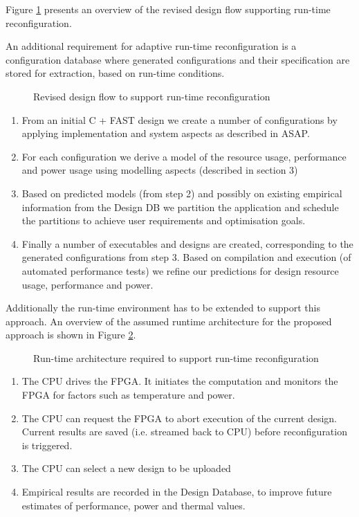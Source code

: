 Figure \ref{fig:reconfig-design-flow} presents an overview of the
revised design flow supporting run-time reconfiguration.

An additional requirement for adaptive run-time reconfiguration is a
configuration database where generated configurations and their
specification are stored for extraction, based on run-time
conditions.

\begin{figure}[!ht]
  \centering
  \def\svgwidth{\textwidth}
  
  \caption{Revised design flow to support run-time reconfiguration}
  \label{fig:reconfig-design-flow}
\end{figure}

\begin{enumerate}
\item From an initial C + FAST design we create a number of
  configurations by applying implementation and system aspects as
  described in ASAP.
\item For each configuration we derive a model of the resource usage,
  performance and power usage using modelling aspects (described in
  section 3)
\item Based on predicted models (from step 2) and possibly on existing
  empirical information from the Design DB we partition the
  application and schedule the partitions to achieve user requirements
  and optimisation goals.
\item Finally a number of executables and designs are created,
  corresponding to the generated configurations from step 3. Based on
  compilation and execution (of automated performance tests) we refine
  our predictions for design resource usage, performance and power.
\end{enumerate}

Additionally the run-time environment has to be extended to support
this approach. An overview of the assumed runtime architecture for the
proposed approach is shown in Figure \ref{fig:reconfig-runtime}.

\begin{figure}[!ht]
  \centering
  \def\svgwidth{30em}
  
  \caption{Run-time architecture required to support run-time reconfiguration}
  \label{fig:reconfig-runtime}
\end{figure}

\begin{enumerate}
\item The CPU drives the FPGA. It initiates the computation and
  monitors the FPGA for factors such as temperature and power.
\item The CPU can request the FPGA to abort execution of the current
  design. Current results are saved (i.e. streamed back to CPU)
  before reconfiguration is triggered.
\item The CPU can select a new design to be uploaded
\item Empirical results are recorded in the Design Database, to
  improve future estimates of performance, power and thermal values.
\end{enumerate}

